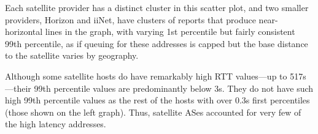Each satellite provider has a distinct cluster in this scatter
plot, and two smaller providers, Horizon and iiNet, have
clusters of reports that produce near-horizontal lines in
the graph, with varying 1st percentile but fairly consistent
99th percentile, as if queuing for these addresses is
capped but the base distance to the satellite varies by geography.

Although some satellite hosts do have remarkably high RTT
values---up to 517s---their 99th percentile values
are predominantly below 3s.  They do not have such
high 99th percentile values as the rest of the hosts with
over 0.3s first percentiles (those shown on the left
graph). Thus, satellite ASes accounted for very few of the high latency
addresses. 


